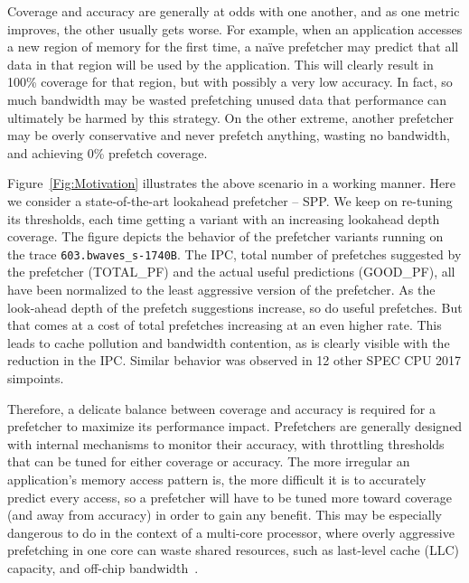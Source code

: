 Coverage and accuracy are generally at odds with one another, and as one metric improves, the other
usually gets worse.  For example, when an application accesses a new region of memory for the first
time, a na\"ive prefetcher may predict that all data in that region will be used by the application.
This will clearly result in 100\% coverage for that region, but with possibly a very low accuracy.
In fact, so much bandwidth may be wasted prefetching unused data that performance can ultimately be
harmed by this strategy.  On the other extreme, another prefetcher may be overly
conservative and never prefetch anything, wasting no bandwidth, and achieving 0\% prefetch
coverage.

Figure~\ref{Fig:Motivation} illustrates the above scenario in a working manner.
Here we consider a state-of-the-art lookahead prefetcher -- SPP. We keep on 
re-tuning its thresholds, each time getting a variant with an increasing lookahead 
depth coverage. The figure depicts the behavior of the prefetcher variants running 
on the trace {\tt 603.bwaves\_s-1740B}. The IPC, total number of prefetches 
suggested by the prefetcher (TOTAL\_PF) and the actual useful predictions (GOOD\_PF),
all have been normalized to the least aggressive version of the prefetcher. 
As the look-ahead depth of the prefetch suggestions increase, so do useful prefetches. 
But that comes at a cost of total prefetches increasing at an even higher rate. This leads 
to cache pollution and bandwidth contention, as is clearly visible with the reduction in 
the IPC. Similar behavior was observed in 12 other SPEC CPU 2017 simpoints. 

Therefore, a delicate balance between coverage and accuracy is required for a prefetcher to maximize
its performance impact.  Prefetchers are generally designed with internal mechanisms to
monitor their accuracy, with throttling thresholds that can be tuned for either coverage 
or accuracy.  The more irregular an application's memory access pattern is, the more difficult
it is to accurately predict every access, so a prefetcher will have to be tuned more toward
coverage (and away from accuracy) in order to gain any benefit.  This may be especially dangerous
to do in the context of a multi-core processor, where overly aggressive prefetching in one core can
waste shared resources, such as last-level cache (LLC) capacity, and off-chip bandwidth~\cite{Friendly}.

